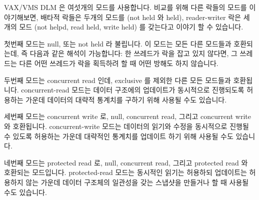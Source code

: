 VAX/VMS DLM 은 여섯개의 모드를 사용합니다.
비교를 위해 다른 락들의 모드를 이야기해보면, 배타적 락들은 두개의 모드를 (not
held 와 held), reader-writer 락은 세개의 모드 (not helpd, read held, write
held) 를 갖는다고 이야기 할 수 있습니다.

첫번째 모드는 null, 또는 not held 라 불립니다.
이 모드는 모든 다른 모드들과 호환되는데, 즉 다음과 같은 해석이 가능합니다:
한 쓰레드가 락을 잡고 있지 않다면, 그 쓰레드는 다른 어떤 쓰레드가 락을 획득하려
할 때 어떤 방해도 하지 않습니다.

두번째 모드는 concurrent read 인데, exclusive 를 제외한 다른 모든 모드들과
호환됩니다.
concurrent-read 모드는 데이터 구조에의 업데이트가 동시적으로 진행되도록
허용하는 가운데 데이터의 대략적 통계치를 구하기 위해 사용될 수도 있습니다.

세번째 모드는 concurrent write 로, null, concurrent read, 그리고 concurrent
write 와 호환됩니다.
concurrent-write 모드는 데이터의 읽기와 수정을 동시적으로 진행될 수 있도록
허용하는 가운데 대략적인 통계치를 업데이트 하기 위해 사용될 수도 있습니다.

네번째 모드는 protected read 로, null, concurrent read, 그리고 protected read
와 호환되는 모드입니다.
protected-read 모드는 동시적인 읽기는 허용하되 업데이트는 허용하지 않는 가운데
데이터 구조체의 일관성을 갖는 스냅샷을 만들거나 할 때 사용될 수도 있습니다.

